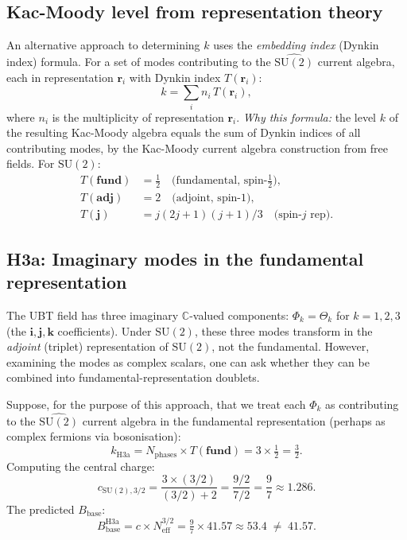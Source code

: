 \documentclass[11pt,a4paper]{article}
\theoremstyle{definition}
\theoremstyle{remark}
\begin{document}
\subsection{Kac-Moody level from representation theory}

An alternative approach to determining $k$ uses the
\emph{embedding index} (Dynkin index) formula.
For a set of modes contributing to the $\widehat{\mathrm{SU}(2)}$
current algebra, each in representation $\mathbf{r}_i$ with Dynkin
index $T(\mathbf{r}_i)$:
\begin{equation}
  k = \sum_i n_i\, T(\mathbf{r}_i),
  \label{eq:k_Dynkin}
\end{equation}
where $n_i$ is the multiplicity of representation $\mathbf{r}_i$.
\textit{Why this formula:} the level $k$ of the resulting Kac-Moody
algebra equals the sum of Dynkin indices of all contributing modes,
by the Kac-Moody current algebra construction from free fields.
For $\mathrm{SU}(2)$:
\begin{align}
  T(\mathbf{fund}) &= \tfrac{1}{2} \quad
    \text{(fundamental, spin-$\tfrac{1}{2}$)}, \label{eq:T_fund} \\
  T(\mathbf{adj}) &= 2 \quad
    \text{(adjoint, spin-1)}, \label{eq:T_adj} \\
  T(\mathbf{j}) &= j(2j+1)(j+1)/3 \quad \text{(spin-$j$ rep).}
    \label{eq:T_j}
\end{align}

\subsection{H3a: Imaginary modes in the fundamental representation}

The UBT field has three imaginary $\mathbb{C}$-valued components:
$\Phi_k = \Theta_k$ for $k = 1, 2, 3$ (the $\mathbf{i},\mathbf{j},\mathbf{k}$
coefficients).
Under $\mathrm{SU}(2)$, these three modes transform in the
\emph{adjoint} (triplet) representation of $\mathrm{SU}(2)$, not the
fundamental.
However, examining the modes as complex scalars, one can ask whether
they can be combined into fundamental-representation doublets.

Suppose, for the purpose of this approach, that we treat each
$\Phi_k$ as contributing to the $\widehat{\mathrm{SU}(2)}$ current
algebra in the fundamental representation (perhaps as complex fermions
via bosonisation):
\begin{equation}
  k_{\mathrm{H3a}}
  = N_{\mathrm{phases}} \times T(\mathbf{fund})
  = 3 \times \tfrac{1}{2}
  = \tfrac{3}{2}.
  \label{eq:k_H3a}
\end{equation}
Computing the central charge:
\begin{equation}
  c_{\mathrm{SU}(2),3/2}
  = \frac{3 \times (3/2)}{(3/2) + 2}
  = \frac{9/2}{7/2}
  = \frac{9}{7}
  \approx 1.286.
  \label{eq:c_H3a}
\end{equation}
The predicted $B_{\mathrm{base}}$:
\begin{equation}
  B_{\mathrm{base}}^{\mathrm{H3a}}
  = c \times N_{\mathrm{eff}}^{3/2}
  = \tfrac{9}{7} \times 41.57
  \approx 53.4
  \;\neq\; 41.57.
  \label{eq:B_H3a}
\end{equation}
\end{document}
